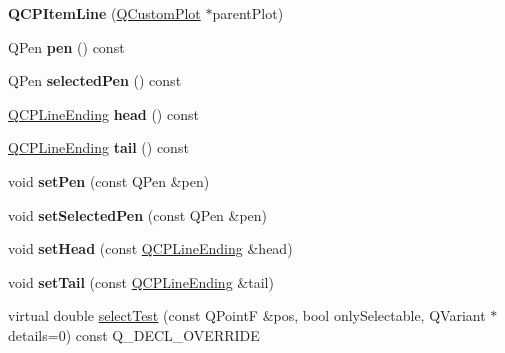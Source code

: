 \begin{DoxyCompactItemize}
{\bfseries Q\+C\+P\+Item\+Line} (\hyperlink{class_q_custom_plot}{Q\+Custom\+Plot} $\ast$parent\+Plot)
\item 
\mbox{\label{class_q_c_p_item_line_a712e5a7f59db3f4c588dfc370a63e225}} 
Q\+Pen {\bfseries pen} () const
\item 
\mbox{\label{class_q_c_p_item_line_ae1782c4fbecd38054ec3d49d8572a5e5}} 
Q\+Pen {\bfseries selected\+Pen} () const
\item 
\mbox{\label{class_q_c_p_item_line_a6cdc9e87e17418d4b0e66eaa0f041407}} 
\hyperlink{class_q_c_p_line_ending}{Q\+C\+P\+Line\+Ending} {\bfseries head} () const
\item 
\mbox{\label{class_q_c_p_item_line_ac085d3939ec11d7a4d592dc2ed578360}} 
\hyperlink{class_q_c_p_line_ending}{Q\+C\+P\+Line\+Ending} {\bfseries tail} () const
\item 
\mbox{\label{class_q_c_p_item_line_a572528dab61c1abe205822fbd5db4b27}} 
void {\bfseries set\+Pen} (const Q\+Pen \&pen)
\item 
\mbox{\label{class_q_c_p_item_line_a3e2fec44503277e77717e9c24f87f1ea}} 
void {\bfseries set\+Selected\+Pen} (const Q\+Pen \&pen)
\item 
\mbox{\label{class_q_c_p_item_line_aebf3d687114d584e0459db6759e2c3c3}} 
void {\bfseries set\+Head} (const \hyperlink{class_q_c_p_line_ending}{Q\+C\+P\+Line\+Ending} \&head)
\item 
\mbox{\label{class_q_c_p_item_line_ac264222c3297a7efe33df9345c811a5f}} 
void {\bfseries set\+Tail} (const \hyperlink{class_q_c_p_line_ending}{Q\+C\+P\+Line\+Ending} \&tail)
\item 
virtual double \hyperlink{class_q_c_p_item_line_a6ab9156f12d5f4cf23bf24121c2bf97c}{select\+Test} (const Q\+PointF \&pos, bool only\+Selectable, Q\+Variant $\ast$details=0) const Q\+\_\+\+D\+E\+C\+L\+\_\+\+O\+V\+E\+R\+R\+I\+DE
\end{DoxyCompactItemize}
